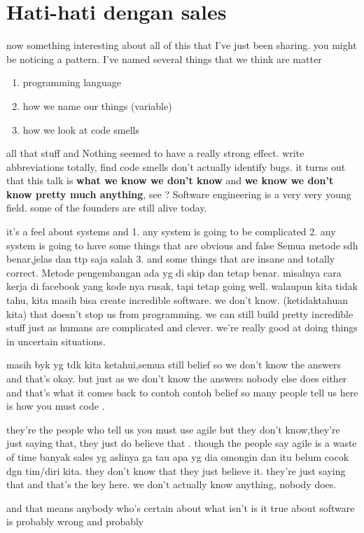 \documentclass[14pt]{extreport}
\begin{document}
\chapter{Hati-hati dengan sales}
now something interesting about all of this that I’ve just been sharing.
you  might be noticing a pattern. I’ve named several things that we think are matter
\begin{enumerate}
	\item programming language 
	\item how we name our things (variable)
	\item how we look at code smells
\end{enumerate}
all that stuff and Nothing seemed to have a really strong effect.
write abbreviations totally, find code smells don’t actually identify bugs.
it turns out that this talk is \textbf{what we know we don’t know} and 
\textbf{we know we don’t know pretty much anything}, see ? 
Software  engineering is a very very young field. some of the founders  are still alive today.
\par
it’s a feel about systems and
1.  any system is going to be complicated
2. any system is going to have some things that are obvious and false
 Semua metode sdh benar,jelas dan ttp saja salah 
3. and some things that are insane and totally correct. 
Metode pengembangan ada yg di skip dan tetap benar. misalnya cara kerja di facebook yang kode nya rusak, tapi tetap going well.
walaupun kita tidak tahu, kita masih bisa create incredible software.
we don’t know. (ketidaktahuan kita)  that doesn’t stop us from programming. 
we can still build pretty incredible stuff just as humans are complicated and clever.
we’re really good at doing things in uncertain situations.
\par
masih byk yg tdk kita ketahui,semua still belief
so we don’t know  the answers and that’s okay. 
but just as we don’t know the
 answers nobody else does either and that’s what it comes
 back to 
 contoh contoh belief
so many people tell us 
here is how you must code
.
\par
they’re the people who tell us you must use agile but they
 don’t know,they’re just saying that, they just do believe that
.
though the people say agile is a waste of time 
 banyak sales yg aslinya ga tau apa yg dia omongin dan itu belum cocok dgn tim/diri kita. 
they don’t  know that they just believe it. they’re just saying that and
that’s the key here.
 we don’t actually know anything, nobody does.
 \par
 and that means anybody who’s certain about what isn’t is it true about software is probably wrong and probably
\end{document}
